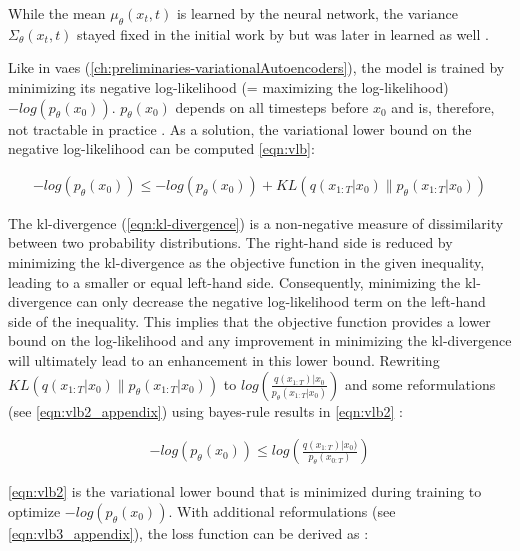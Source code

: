 While the mean $\mu_{\theta}(x_t, t)$ is learned by the neural network, the variance $\Sigma_{\theta}(x_t, t)$ stayed fixed in the initial work by \cite{ho2020DenoisingDiffusionProbabilistic} 
but was later in \cite{nichol2021ImprovedDenoisingDiffusion} learned as well \cite{zbinden2022ImplementingExperimentingDiffusion}.

Like in \glspl{vae} (\autoref{ch:preliminaries-variationalAutoencoders}), the model is trained by minimizing its negative log-likelihood (= maximizing the log-likelihood) $-log(p_\theta(x_0))$.
$p_\theta(x_0)$ depends on all timesteps before $x_0$ and is, therefore, not tractable in practice \cite{zbinden2022ImplementingExperimentingDiffusion}.
As a solution, the variational lower bound on the negative log-likelihood can be computed \autoref{eqn:vlb}: %

\begin{equation}
  \label{eqn:vlb}
  \begin{align*}
    -log(p_\theta(x_0)) \leq -log(p_\theta(x_0)) + KL(q(x_{1:T}|x_0) \parallel p_\theta(x_{1:T}|x_0))
  \end{align*}
\end{equation}

The \gls{kl}-divergence (\autoref{eqn:kl-divergence}) is a non-negative measure of dissimilarity between two probability distributions. 
The right-hand side is reduced by minimizing the \gls{kl}-divergence as the objective function in the given inequality, leading to a smaller or equal left-hand side. 
Consequently, minimizing the \gls{kl}-divergence can only decrease the negative log-likelihood term on the left-hand side of the inequality. 
This implies that the objective function provides a lower bound on the log-likelihood and any improvement in minimizing the \gls{kl}-divergence will ultimately lead to an enhancement in this lower bound.
Rewriting $KL(q(x_{1:T}|x_0) \parallel p_\theta(x_{1:T}|x_0))$ to $log(\frac{q(x_{1:T})|x_0}{p_\theta(x_{1:T}|x_0)})$ and some reformulations (see \autoref{eqn:vlb2_appendix}) using bayes-rule results in \autoref{eqn:vlb2} \cite{ho2020DenoisingDiffusionProbabilistic}:

\begin{equation}
  \label{eqn:vlb2}
  \begin{align*}
    -log(p_\theta(x_0)) \leq log(\frac{q(x_{1:T})|x_0)}{p_\theta(x_{0:T})})
  \end{align*}
\end{equation}

\autoref{eqn:vlb2} is the variational lower bound that is minimized during training to optimize $-log(p_\theta(x_0))$.
With additional reformulations (see \autoref{eqn:vlb3_appendix}), the loss function can be derived as \cite{ho2020DenoisingDiffusionProbabilistic}:

